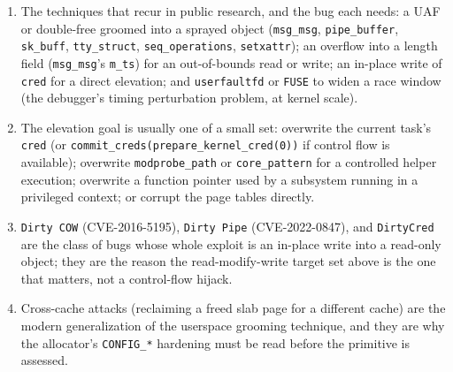 \documentclass[12pt]{Training}
\begin{document}
\begin{enumerate}
\begin{enumerate}
        \item \textbf{Stack canary} (\lstinline{CONFIG_STACKPROTECTOR}): an overwrite past a stack buffer must reproduce the per-task canary, which is why the canary is usually leaked rather than brute-forced.
        \item \textbf{SLUB freelist hardening} (\lstinline{CONFIG_SLAB_FREELIST_HARDENED}/\lstinline{_RANDOM}): the freelist pointer is mangled and the next free object is randomized, so the classic ``overwrite the next pointer'' groom is no longer deterministic.
        \item \textbf{usercopy hardening}, \lstinline{INIT_ON_ALLOC}/\lstinline{INIT_ON_FREE}, and \lstinline{STATIC_USERMODEHELPER}: remove the easy uninitialized-read, the reused-object, and the \lstinline{modprobe_path} primitives respectively. Read the target's config before choosing a technique.
    \end{enumerate}
    \item The techniques that recur in public research, and the bug each needs: a UAF or double-free groomed into a sprayed object (\lstinline{msg_msg}, \lstinline{pipe_buffer}, \lstinline{sk_buff}, \lstinline{tty_struct}, \lstinline{seq_operations}, \lstinline{setxattr}); an overflow into a length field (\lstinline{msg_msg}'s \lstinline{m_ts}) for an out-of-bounds read or write; an in-place write of \lstinline{cred} for a direct elevation; and \lstinline{userfaultfd} or \lstinline{FUSE} to widen a race window (the debugger's timing perturbation problem, at kernel scale).
    \item The elevation goal is usually one of a small set: overwrite the current task's \lstinline{cred} (or \lstinline{commit_creds(prepare_kernel_cred(0))} if control flow is available); overwrite \lstinline{modprobe_path} or \lstinline{core_pattern} for a controlled helper execution; overwrite a function pointer used by a subsystem running in a privileged context; or corrupt the page tables directly.
    \item \lstinline{Dirty COW} (CVE-2016-5195), \lstinline{Dirty Pipe} (CVE-2022-0847), and \lstinline{DirtyCred} are the class of bugs whose whole exploit is an in-place write into a read-only object; they are the reason the read-modify-write target set above is the one that matters, not a control-flow hijack.
    \item Cross-cache attacks (reclaiming a freed slab page for a different cache) are the modern generalization of the userspace grooming technique, and they are why the allocator's \lstinline{CONFIG_*} hardening must be read before the primitive is assessed.
\end{enumerate}
\end{document}
